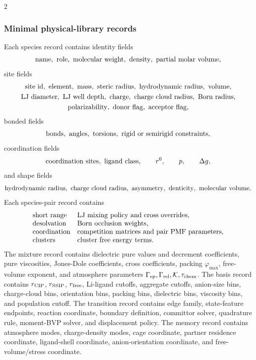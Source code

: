 \documentclass[10pt]{article}
\begin{document}
\begin{multicols}{2}
\subsubsection{Minimal physical-library records}

Each species record contains identity fields
\[
{\rm name,\ role,\ molecular\ weight,\ density,\ partial\ molar\ volume},
\]
site fields
\[
\begin{gathered}
{\rm site\ id,\ element,\ mass,\ steric\ radius,\ hydrodynamic\ radius,\ volume},\\
{\rm LJ\ diameter,\ LJ\ well\ depth,\ charge,\ charge\ cloud\ radius,\ Born\ radius},\\
{\rm polarizability,\ donor\ flag,\ acceptor\ flag},
\end{gathered}
\]
bonded fields
\[
{\rm bonds,\ angles,\ torsions,\ rigid\ or\ semirigid\ constraints},
\]
coordination fields
\[
{\rm coordination\ sites,\ ligand\ class},\qquad r^0,\qquad p,\qquad \Delta g,
\]
and shape fields
\[
{\rm hydrodynamic\ radius,\ charge\ cloud\ radius,\ asymmetry,\ denticity,\
molecular\ volume}.
\]
Each species-pair record contains
\[
\begin{array}{ll}
{\rm short\ range} & {\rm LJ\ mixing\ policy\ and\ cross\ overrides},\\
{\rm desolvation} & {\rm Born\ occlusion\ weights},\\
{\rm coordination} & {\rm competition\ matrices\ and\ pair\ PMF\ parameters},\\
{\rm clusters} & {\rm cluster\ free\ energy\ terms}.
\end{array}
\]
The mixture record contains dielectric pure values and decrement coefficients,
pure viscosities, Jones-Dole coefficients, cross coefficients, packing
\(\varphi_{\max}\), free-volume exponent, and atmosphere parameters
\(\Gamma_{\rm ep},\Gamma_{\rm rel},\mathcal K,\tau_{\rm chem}\). The basis
record contains \(r_{\rm CIP}\), \(r_{\rm SSIP}\), \(r_{\rm free}\),
Li-ligand cutoffs, aggregate cutoffs, anion-size bins, charge-cloud bins,
orientation bins, packing bins, dielectric bins, viscosity bins, and
population cutoff. The transition record contains edge family, state-feature
endpoints, reaction coordinate, boundary definition, committor solver,
quadrature rule, moment-BVP solver, and displacement policy. The memory record
contains atmosphere modes, charge-density modes, cage coordinate, partner
residence coordinate, ligand-shell coordinate, anion-orientation coordinate,
and free-volume/stress coordinate.


\end{multicols}
\end{document}
